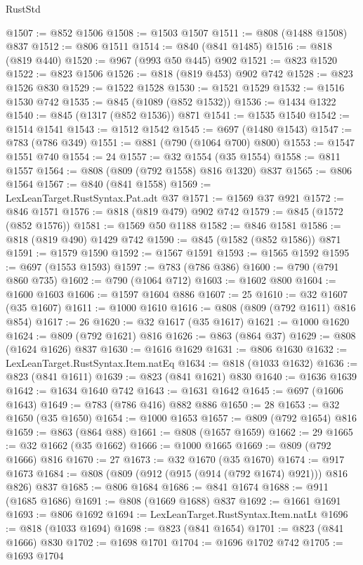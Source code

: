 \begin{lexlean}{RustStd}
\begin{coremodule}
@1507 := @852 @1506
@1508 := @1503 @1507
@1511 := @808 (@1488 @1508) @837
@1512 := @806 @1511
@1514 := @840 (@841 @1485)
@1516 := @818 (@819 @440)
@1520 := @967 (@993 @50 @445) @902
@1521 := @823 @1520
@1522 := @823 @1506
@1526 := @818 (@819 @453) @902 @742
@1528 := @823 @1526 @830
@1529 := @1522 @1528
@1530 := @1521 @1529
@1532 := @1516 @1530 @742
@1535 := @845 (@1089 (@852 @1532))
@1536 := @1434 @1322
@1540 := @845 (@1317 (@852 @1536)) @871
@1541 := @1535 @1540
@1542 := @1514 @1541
@1543 := @1512 @1542
@1545 := @697 (@1480 @1543)
@1547 := @783 (@786 @349)
@1551 := @881 (@790 (@1064 @700) @800)
@1553 := @1547 @1551 @740
@1554 := 24
@1557 := @32 @1554 (@35 @1554)
@1558 := @811 @1557
@1564 := @808 (@809 (@792 @1558) @816 @1320) @837
@1565 := @806 @1564
@1567 := @840 (@841 @1558)
@1569 := LexLeanTarget.RustSyntax.Pat.adt @37
@1571 := @1569 @37 @921
@1572 := @846 @1571
@1576 := @818 (@819 @479) @902 @742
@1579 := @845 (@1572 (@852 @1576))
@1581 := @1569 @50 @1188
@1582 := @846 @1581
@1586 := @818 (@819 @490) @1429 @742
@1590 := @845 (@1582 (@852 @1586)) @871
@1591 := @1579 @1590
@1592 := @1567 @1591
@1593 := @1565 @1592
@1595 := @697 (@1553 @1593)
@1597 := @783 (@786 @386)
@1600 := @790 (@791 @860 @735)
@1602 := @790 (@1064 @712)
@1603 := @1602 @800
@1604 := @1600 @1603
@1606 := @1597 @1604 @886
@1607 := 25
@1610 := @32 @1607 (@35 @1607)
@1611 := @1000 @1610
@1616 := @808 (@809 (@792 @1611) @816 @854)
@1617 := 26
@1620 := @32 @1617 (@35 @1617)
@1621 := @1000 @1620
@1624 := @809 (@792 @1621) @816
@1626 := @863 (@864 @37)
@1629 := @808 (@1624 @1626) @837
@1630 := @1616 @1629
@1631 := @806 @1630
@1632 := LexLeanTarget.RustSyntax.Item.natEq
@1634 := @818 (@1033 @1632)
@1636 := @823 (@841 @1611)
@1639 := @823 (@841 @1621) @830
@1640 := @1636 @1639
@1642 := @1634 @1640 @742
@1643 := @1631 @1642
@1645 := @697 (@1606 @1643)
@1649 := @783 (@786 @416) @882 @886
@1650 := 28
@1653 := @32 @1650 (@35 @1650)
@1654 := @1000 @1653
@1657 := @809 (@792 @1654) @816
@1659 := @863 (@864 @88)
@1661 := @808 (@1657 @1659)
@1662 := 29
@1665 := @32 @1662 (@35 @1662)
@1666 := @1000 @1665
@1669 := @809 (@792 @1666) @816
@1670 := 27
@1673 := @32 @1670 (@35 @1670)
@1674 := @917 @1673
@1684 := @808 (@809 (@912 (@915 (@914 (@792 @1674) @921))) @816 @826) @837
@1685 := @806 @1684
@1686 := @841 @1674
@1688 := @911 (@1685 @1686)
@1691 := @808 (@1669 @1688) @837
@1692 := @1661 @1691
@1693 := @806 @1692
@1694 := LexLeanTarget.RustSyntax.Item.natLt
@1696 := @818 (@1033 @1694)
@1698 := @823 (@841 @1654)
@1701 := @823 (@841 @1666) @830
@1702 := @1698 @1701
@1704 := @1696 @1702 @742
@1705 := @1693 @1704

\end{coremodule}
\end{lexlean}
